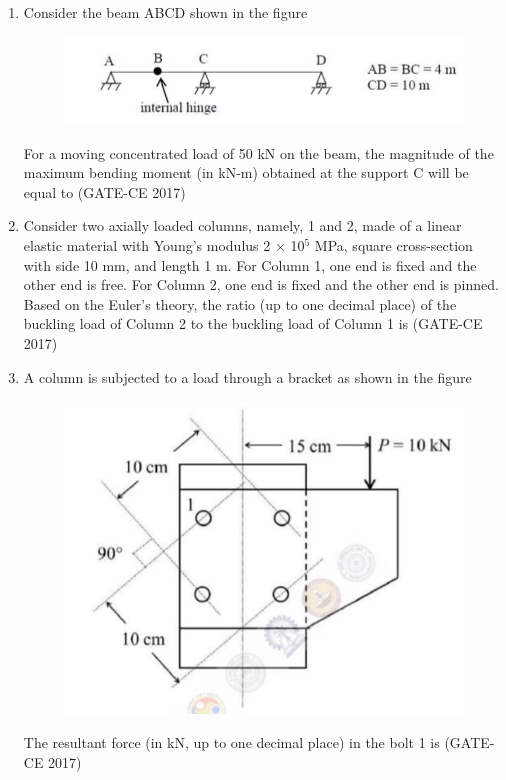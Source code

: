 \documentclass[journal,12pt,onecolumn]{article}
\theoremstyle{remark}
\begin{document}
\begin{enumerate}
    \item Consider the beam ABCD shown in the figure 
    \begin{figure}[H]
    \centering
    \includegraphics[width=0.7\columnwidth]{figs/imageq41.jpg}  
    \caption{}
    \label{fig:41}
    \end{figure}
    For a moving concentrated load of 50 kN on the beam, the magnitude of the maximum bending moment (in kN-m) obtained at the support C will be equal to \underline{\hspace{3cm}}\hfill (GATE-CE 2017)

    \item Consider two axially loaded columns, namely, 1 and 2, made of a linear elastic material with Young's modulus 2 $\times$ 10$^5$ MPa, square cross-section with side 10 mm, and length 1 m. For Column 1, one end is fixed and the other end is free. For Column 2, one end is fixed and the other end is pinned. Based on the Euler's theory, the ratio (up to one decimal place) of the buckling load of Column 2 to the buckling load of Column 1 is \underline{\hspace{3cm}}\hfill (GATE-CE 2017)

    \item A column is subjected to a load through a bracket as shown in the figure 
    \begin{figure}[H]
    \centering
    \includegraphics[width=0.7\columnwidth]{figs/imageq43.jpg}  
    \caption{}
    \label{fig:43}
    \end{figure}
    The resultant force (in kN, up to one decimal place) in the bolt 1 is \underline{\hspace{3cm}}\hfill (GATE-CE 2017)


\end{enumerate}
\end{document}
